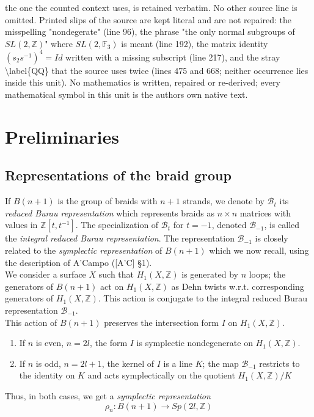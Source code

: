 \documentclass[10pt,a4paper]{amsart}
\begin{document}
the one the counted context uses, is retained verbatim. No other source line is omitted. Printed slips of the source are kept literal and are not repaired: the misspelling "nondegerate" (line 96), the phrase "the only normal subgroups of $SL(2,\mathbb{Z})$" where $SL(2,\mathbb{F}_3)$ is meant (line 192), the matrix identity $(s_2s^{-1})^4=Id$ written with a missing subscript (line 217), and the stray \textbackslash{}label\{QQ\} that the source uses twice (lines 475 and 668; neither occurrence lies inside this unit). No mathematics is written, repaired or re-derived; every mathematical symbol in this unit is the author\textquotesingle s own native text.
\section{Preliminaries}
\subsection{Representations of the braid group}\label{paragraphe sur les representations}
If $B(n+1)$ is the group of braids with $n+1$ strands, we denote by 
$\mathcal B_t$ its {\it reduced Burau representation} which represents braids as $n\times n$ matrices with values in $\mathbb{Z}[t,t^{-1}]$. The specialization of $\mathcal B_t$ for $t=-1$, denoted $\mathcal B_{-1}$, is called the {\it integral reduced Burau representation}. The representation $\mathcal B_{-1}$ is closely related to the {\it symplectic representation} of $B(n+1)$ which we now recall, using the description of A'Campo ([A'C] \S  1).\\
We consider a surface $X$ such that $H_1(X,\mathbb{Z})$ is generated by $n$ loops; the generators of $B(n+1)$ act on $H_1(X,\mathbb{Z})$ as Dehn twists w.r.t. corresponding generators of $H_1(X,\mathbb{Z})$. This action is conjugate to the integral reduced Burau representation ${\mathcal B}_{-1}$. \\  
This action of $B(n+1)$ preserves the intersection form $I$ on $H_1(X,\mathbb{Z})$. 
\begin{enumerate}
	\item 
	If $n$ is even, $n=2l$, the form $I$ is symplectic nondegenerate on $H_1(X,\mathbb{Z})$.
	\item
	If $n$ is odd, $n=2l+1$, the kernel of $I$ is a line $K$; the map $\mathcal B_{-1}$ restricts to the identity on $K$ and  acts symplectically on the quotient $H_1(X,\mathbb{Z})/K$ 
\end{enumerate}
Thus, in both cases, we get  a {\it symplectic representation}
\begin{equation}\label{representation symplectique0}
\rho_n:B(n+1)\longrightarrow Sp(2l,\mathbb{Z})
\end{equation} 
\end{document}

